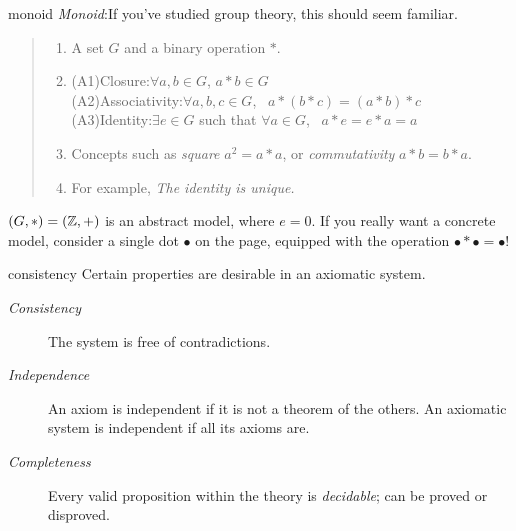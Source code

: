 \begin{example}{}{monoid}
	\emph{Monoid}:\lstsp If you've studied group theory, this should seem familiar.\vspace{-5pt}
	\begin{quote}
		\begin{enumerate}
		  \item A set $G$ and a binary operation $\ast$.
		  \item (A1)\lstsp Closure:\quad $\forall a,b\in G$, $a\ast b\in G$\\
	  	\lstsp(A2)\lstsp Associativity:\quad $\forall a,b,c\in G$, \ $a\ast(b\ast c)=(a\ast b)\ast c$\\
	  	\lstsp(A3)\lstsp Identity:\quad $\exists e\in G$ such that $\forall a\in G$, \ $a\ast e=e\ast a=a$
		  \item Concepts such as \emph{square} $a^2=a\ast a$, or \emph{commutativity} $a\ast b=b\ast a$.
		  \item For example, \emph{The identity is unique.}
		\end{enumerate}
	\end{quote}
	$(G,*)=(\mathbb{Z},+)$ is an abstract model, where $e=0$. If you really want a concrete model, consider a single dot $\bullet$ on the page, equipped with the operation $\bullet *\bullet =\bullet$!
\end{example}


\goodbreak



\begin{defn}{}{consistency}
	Certain properties are desirable in an axiomatic system.
	\begin{description}
		\item[\normalfont\emph{Consistency}] The system is free of contradictions.
		\item[\normalfont\emph{Independence}] An axiom is independent if it is not a theorem of the others. An axiomatic system is independent if all its axioms are. 
		\item[\normalfont\emph{Completeness}] Every valid proposition within the theory is \emph{decidable}; can be proved or disproved.
	\end{description}
\end{defn}


